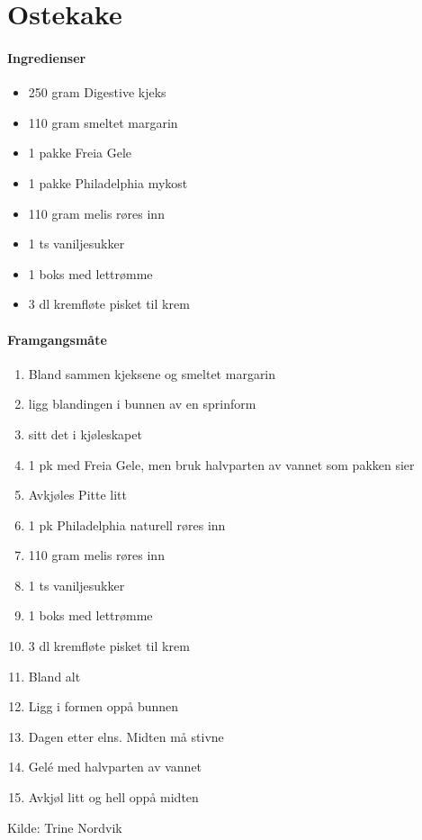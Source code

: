 \section{﻿Ostekake}


\paragraph{Ingredienser}
\begin{itemize}[noitemsep]
	\item 250 gram Digestive kjeks
	\item 110 gram smeltet margarin
	\item 1 pakke Freia Gele
	\item 1 pakke Philadelphia mykost
	\item 110 gram melis røres inn
	\item 1 ts vaniljesukker
	\item 1 boks med lettrømme
	\item 3 dl kremfløte pisket til krem
\end{itemize}

\paragraph{Framgangsmåte}
\begin{enumerate}[noitemsep]
	\item Bland sammen kjeksene og smeltet margarin
	\item ligg blandingen i bunnen av en sprinform
	\item sitt det i kjøleskapet
	\item 1 pk med Freia Gele, men bruk halvparten av vannet som pakken sier
	\item Avkjøles Pitte litt
	\item 1 pk Philadelphia naturell røres inn
	\item 110 gram melis røres inn
	\item 1 ts vaniljesukker
	\item 1 boks med lettrømme
	\item 3 dl kremfløte pisket til krem
	\item Bland alt
	\item Ligg i formen oppå bunnen
	\item Dagen etter elns.  Midten må stivne
	\item Gelé med halvparten av vannet
	\item Avkjøl litt og hell oppå midten
\end{enumerate}

Kilde: Trine Nordvik
